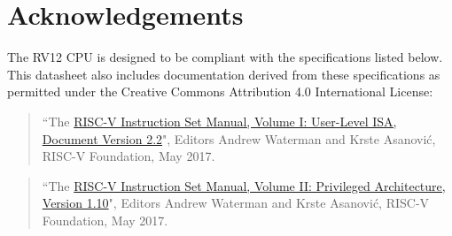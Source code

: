 \chapter{Acknowledgements}\label{acknowledgements}

The RV12 CPU is designed to be compliant with the specifications listed below.  This datasheet also includes documentation derived from these specifications as permitted under the Creative Commons Attribution 4.0 International License:

\begin{quote}
	``The \href{https://github.com/riscv/riscv-isa-manual/blob/master/release/riscv-spec-v2.2.pdf}{RISC-V Instruction Set Manual, Volume I: User-Level ISA, Document
	Version 2.2}", Editors Andrew Waterman and Krste Asanović, RISC-V
	Foundation, May 2017.
\end{quote}

\begin{quote}
	``The \href{https://github.com/riscv/riscv-isa-manual/blob/master/release/riscv-privileged-v1.10.pdf}{RISC-V Instruction Set Manual, Volume II: Privileged Architecture,
	Version 1.10}", Editors Andrew Waterman and Krste Asanović, RISC-V
	Foundation, May 2017.
\end{quote}
